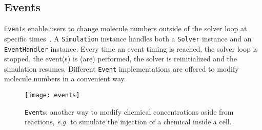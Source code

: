 \subsection{Events}

\texttt{Event}s enable users to change molecule numbers outside of the solver loop at specific times~. A \texttt{Simulation} instance handles both a \texttt{Solver} instance and an \texttt{EventHandler} instance. Every time an event timing is reached, the solver loop is stopped, the event(s) is (are) performed, the solver is reinitialized and the simulation resumes. Different \texttt{Event} implementations are offered to modify molecule numbers in a convenient way.

\begin{figure}[!h]
  \centering
  \texttt{[image: events]}
  \caption{\texttt{Event}s: another way to modify chemical concentrations aside from reactions, \textit{e.g.} to simulate the injection of a chemical inside a cell.}
  \label{fig:events}
\end{figure}
